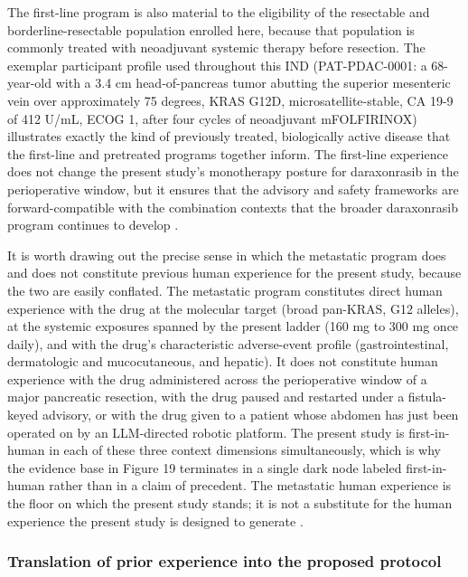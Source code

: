 The first-line program is also material to the eligibility of the resectable and
borderline-resectable population enrolled here, because that population is commonly
treated with neoadjuvant systemic therapy before resection. The exemplar
participant profile used throughout this IND (PAT-PDAC-0001: a 68-year-old with a
3.4 cm head-of-pancreas tumor abutting the superior mesenteric vein over
approximately 75 degrees, KRAS G12D, microsatellite-stable, CA 19-9 of 412 U/mL,
ECOG 1, after four cycles of neoadjuvant mFOLFIRINOX) illustrates exactly the kind
of previously treated, biologically active disease that the first-line and
pretreated programs together inform. The first-line experience does not change the
present study's monotherapy posture for daraxonrasib in the perioperative window,
but it ensures that the advisory and safety frameworks are forward-compatible with
the combination contexts that the broader daraxonrasib program continues to
develop \cite{daraxwhipple, oncotrialllm}.

It is worth drawing out the precise sense in which the metastatic program does and
does not constitute previous human experience for the present study, because the
two are easily conflated. The metastatic program constitutes direct human
experience with the drug at the molecular target (broad pan-KRAS, G12 alleles), at
the systemic exposures spanned by the present ladder (160 mg to 300 mg once daily),
and with the drug's characteristic adverse-event profile (gastrointestinal,
dermatologic and mucocutaneous, and hepatic). It does not constitute human
experience with the drug administered across the perioperative window of a major
pancreatic resection, with the drug paused and restarted under a fistula-keyed
advisory, or with the drug given to a patient whose abdomen has just been operated
on by an LLM-directed robotic platform. The present study is first-in-human in each
of these three context dimensions simultaneously, which is why the evidence base in
Figure 19 terminates in a single dark node labeled first-in-human rather than in a
claim of precedent. The metastatic human experience is the floor on which the
present study stands; it is not a substitute for the human experience the present
study is designed to generate \cite{daraxwhipple, onpremwhippl, phase1guidance}.

\subsubsection*{Translation of prior experience into the proposed protocol}

